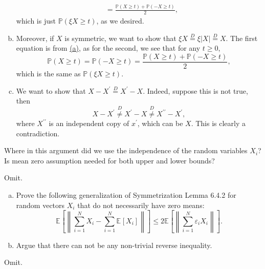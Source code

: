 \begin{answer}
\begin{enumerate}[(a)]
\[\begin{split}
				       & = \frac{\mathbb{P} (X \geq t) + \mathbb{P} (-X \geq t)}{2},
			      \end{split}
		      \]
		      which is just \(\mathbb{P} (\xi X \geq t)\), as we desired.
		\item Moreover, if \(X\) is symmetric, we want to show that \(\xi X \overset{D}{=} \xi \lvert X \rvert \overset{D}{=} X\). The first equation is from \hyperref[ex6.4.1:a]{(a)}, as for the second, we see that for any \(t \geq 0\),
		      \[
			      \mathbb{P} (X \geq t)
			      = \mathbb{P} (-X \geq t)
			      = \frac{\mathbb{P} (X \geq t) + \mathbb{P} (-X \geq t)}{2},
		      \]
		      which is the same as \(\mathbb{P} (\xi X \geq t)\).
		\item We want to show that \(X - X^{\prime} \overset{D}{=} X^{\prime} - X\). Indeed, suppose this is not true, then
		      \[
			      X - X^{\prime}
			      \overset{D}{\neq } X^{\prime} - X
			      \overset{D}{\neq } X^{\prime\prime} - X^{\prime} ,
		      \]
		      where \(X^{\prime\prime} \) is an independent copy of \(x^{\prime} \), which can be \(X\). This is clearly a contradiction.
	\end{enumerate}
\end{answer}

\begin{problem*}[Exercise 6.4.3]\label{ex6.4.3}
	Where in this argument did we use the independence of the random variables \(X_i\)? Is mean zero assumption needed for both upper and lower bounds?
\end{problem*}
\begin{answer}
	Omit.
\end{answer}

\begin{problem*}[Exercise 6.4.4]\label{ex6.4.4}
	\begin{enumerate}[(a)]
		\item\label{ex6.4.4:a} Prove the following generalization of Symmetrization Lemma 6.4.2 for random vectors \(X_i\) that do not necessarily have zero means:
		      \[
			      \mathbb{E}_{}\left[\left\lVert \sum_{i=1}^{N} X_i - \sum_{i=1}^{N} \mathbb{E}_{}[X_i] \right\rVert \right]
			      \leq 2 \mathbb{E}_{}\left[\left\lVert \sum_{i=1}^{N} \varepsilon _i X_i \right\rVert \right] .
		      \]
		\item\label{ex6.4.4:b} Argue that there can not be any non-trivial reverse inequality.
	\end{enumerate}
\end{problem*}
\begin{answer}
	Omit.
\end{answer}

